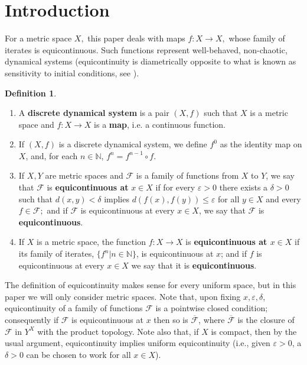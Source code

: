 \documentclass[12pt]{amsart}
\theoremstyle{definition}
\newtheorem{definition}[theorem]{Definition}
\numberwithin{equation}{section}
\begin{document}


\maketitle

\section{Introduction}

For a metric space $X,$ this paper deals with maps $f \colon X \longrightarrow X,$ whose family of iterates is equicontinuous. Such functions represent well-behaved, non-chaotic, dynamical systems (equicontinuity 
is diametrically opposite to what is known as sensitivity to initial conditions, see \cite[Theorem~2.4]{Akin}). 

\begin{definition}\label{def:dynamicalsystem}\hfill
\begin{enumerate}
\item A {\bf discrete dynamical system} is a pair $(X,f)$ such that $X$ is a metric space and 
         $f \colon X\longrightarrow X$ is a {\bf map}, i.e. a continuous function.
\item If $(X,f)$ is a discrete dynamical system, we define $f^0$ as the identity map on $X$, and, for each 
        $n \in \mathbb N$, $f^n = f^{n-1} \circ f$.
\item If $X,Y$ are metric spaces and $\mathcal F$ is a family of functions from $X$ to $Y$, we say that 
         $\mathcal F$ is {\bf equicontinuous at} $x \in X$ if for every $\varepsilon>0$ there exists a $\delta>0$ such 
         that $d(x,y) < \delta$ implies $d(f(x),f(y))\leq\varepsilon$ for all $y\in X$ and every $f\in\mathcal F;$ and if 
         $\mathcal F$ is equicontinuous at every $x\in X$, we say that
         $\mathcal F$ is {\bf equicontinuous}.
\item If $X$ is a metric space, the function $f \colon X\longrightarrow X$ is  {\bf equicontinuous at $x\in X$} if its 
         family of iterates, $\{f^n\big|n\in\mathbb N\}$, is equicontinuous at $x$; and if $f$ is equicontinuous at every 
         $x\in X$ we say that it is {\bf equicontinuous}.
\end{enumerate}
\end{definition}

The definition of equicontinuity makes sense for every uniform space, but in this paper we will only consider metric spaces. Note that, upon fixing $x,\varepsilon,\delta$, equicontinuity of a family of functions $\mathcal F$ is a pointwise closed condition; consequently if $\mathcal F$ is equicontinuous at $x$ then so is $\overline{\mathcal F}$, where $\overline{\mathcal F}$ is the closure of $\mathcal F$ in $Y^X$ with the product topology. Note also that, if $X$ is compact, then by the usual argument, equicontinuity implies uniform equicontinuity (i.e., given 
$\varepsilon>0$, a $\delta>0$ can be chosen to work for all $x\in X$).
\end{document}
